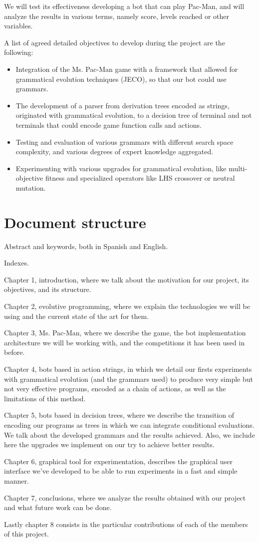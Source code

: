 We will test its effectiveness developing a bot that can play Pac-Man, and will analyze the results in various terms, namely score, levels reached or other variables.
 
A list of agreed detailed objectives to develop during the project are the following:
\begin{itemize}
\item Integration of the Ms. Pac-Man game with a framework that allowed for grammatical evolution techniques (JECO), so that our bot could use grammars.

\item The development of a parser from derivation trees encoded as strings, originated with grammatical evolution, to a decision tree of terminal and not terminals that could encode game function calls and actions.

\item Testing and evaluation of various grammars with different search space complexity, and various degrees of expert knowledge aggregated.

\item Experimenting with various upgrades for grammatical evolution, like multi-objective fitness and specialized operators like LHS crossover or neutral mutation. 
\end{itemize}

\section{Document structure}
Abstract and keywords, both in Spanish and English.

Indexes.

Chapter 1, introduction, where we talk about the motivation for our project, its objectives, and its structure.

Chapter 2, evolutive programming, where we explain the technologies we will be using and the current state of the art for them.

Chapter 3, Ms. Pac-Man, where we describe the game, the bot implementation architecture we will be working with, and the competitions it has been used in before.

Chapter 4, bots based in action strings, in which we detail our firsts experiments with grammatical evolution (and the grammars used) to produce very simple but not very effective programs, encoded as a chain of actions, as well as the limitations of this method.

Chapter 5, bots based in decision trees, where we describe the transition of encoding our programs as trees in which we can integrate conditional evaluations. We talk about the developed grammars and the results achieved. Also, we include here the upgrades we implement on our try to achieve better results.

Chapter 6, graphical tool for experimentation, describes the graphical user interface we’ve developed to be able to run experiments in a fast and simple manner.

Chapter 7, conclusions, where we analyze the results obtained with our project and what future work can be done.

Lastly chapter 8 consists in the particular contributions of each of the members of this project.
